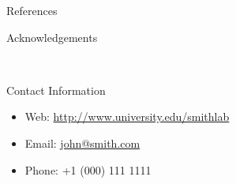 \documentclass[final]{beamer}
\newlength{\onecolwid}
\begin{document}
\begin{frame}[t]
\begin{columns}[t]
\begin{column}{\onecolwid}
\begin{block}{References}
\end{block}



\begin{block}{Acknowledgements}

\small{} \\

\end{block}



\begin{alertblock}{Contact Information}

\begin{itemize}
\item Web: \href{http://www.university.edu/smithlab}{http://www.university.edu/smithlab}
\item Email: \href{mailto:john@smith.com}{john@smith.com}
\item Phone: +1 (000) 111 1111
\end{itemize}

\end{alertblock}



\end{column} %
\end{columns} %
\end{frame} %
\end{document}
